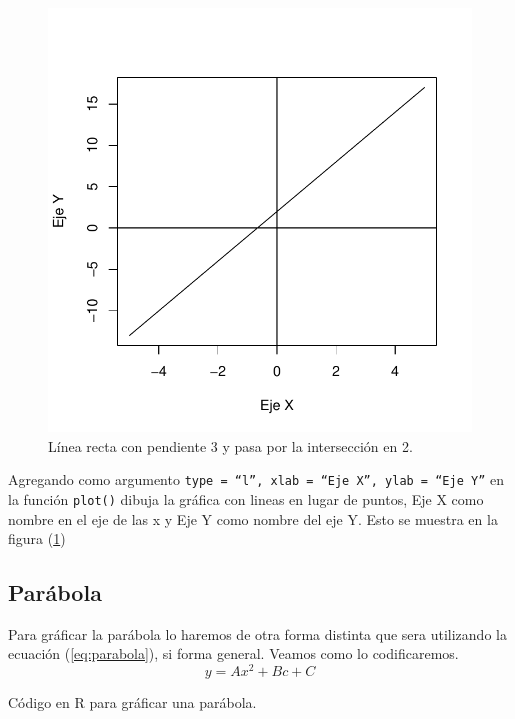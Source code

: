 \documentclass[12pt,a4paper]{article} %
\begin{document}
\begin{figure}
\centering
\includegraphics[scale=0.8]{recta1}
\caption{Línea recta con pendiente 3 y pasa por la intersección en 2.}
\label{fig:recta1}
\end{figure}

Agregando como argumento \texttt{type = ``l'', xlab = ``Eje X'', ylab = ``Eje Y''} en la función \texttt{plot()} dibuja la gráfica con lineas en lugar de puntos, Eje X como nombre en el eje de las x y Eje Y como nombre del eje Y. Esto se muestra en la figura (\ref{fig:recta1})

\subsection{Parábola} \label{subsec:parabola}

Para gráficar la parábola lo haremos de otra forma distinta que sera utilizando la ecuación (\ref{eq:parabola}), si forma general. Veamos como lo codificaremos.
\begin{equation}
y = Ax^2 + Bc + C \label{eq:parabola}
\end{equation}

\begin{table}[htpb]
	
	\caption{Código en R para gráficar una parábola.}
	\label{alg:parabola}
\end{table}
\end{document}
